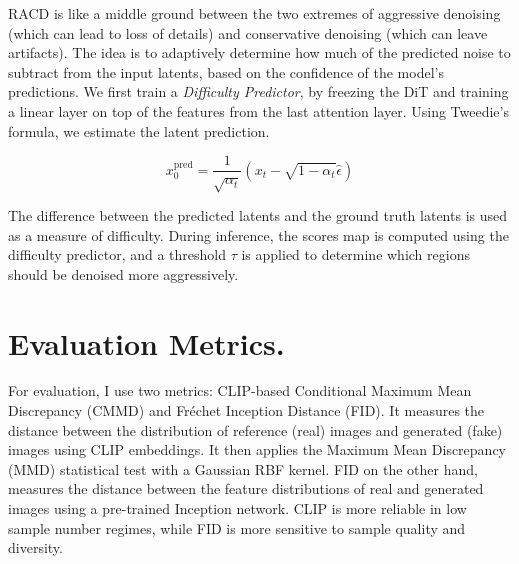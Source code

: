 \documentclass[10pt]{article}
\theoremstyle{plain}
\begin{document}
RACD is like a middle ground between the two extremes of aggressive denoising (which can lead to loss of details) and conservative denoising (which can leave artifacts). The idea is to adaptively determine how much of the predicted noise to subtract from the input latents, based on the confidence of the model's predictions. We first train a \emph{Difficulty Predictor}, by freezing the DiT and training a linear layer on top of the features from the last attention layer. Using Tweedie's formula, we estimate the latent prediction. 

\[
    x_0^{\text{pred}} = \frac{1}{\sqrt{\alpha_t}} \left( x_t - \sqrt{1 - \alpha_t} \hat{\epsilon} \right)
\]

The difference between the predicted latents and the ground truth latents is used as a measure of difficulty. During inference, the scores map is computed using the difficulty predictor, and a threshold \(\tau\) is applied to determine which regions should be denoised more aggressively. 

\section{Evaluation Metrics.}

For evaluation, I use two metrics: CLIP-based Conditional Maximum Mean Discrepancy (CMMD) and Fréchet Inception Distance (FID). It measures the distance between the distribution of reference (real) images and generated (fake) images using CLIP embeddings. It then applies the Maximum Mean Discrepancy (MMD) statistical test with a Gaussian RBF kernel. FID on the other hand, measures the distance between the feature distributions of real and generated images using a pre-trained Inception network. CLIP is more reliable in low sample number regimes, while FID is more sensitive to sample quality and diversity. 


\end{document}
